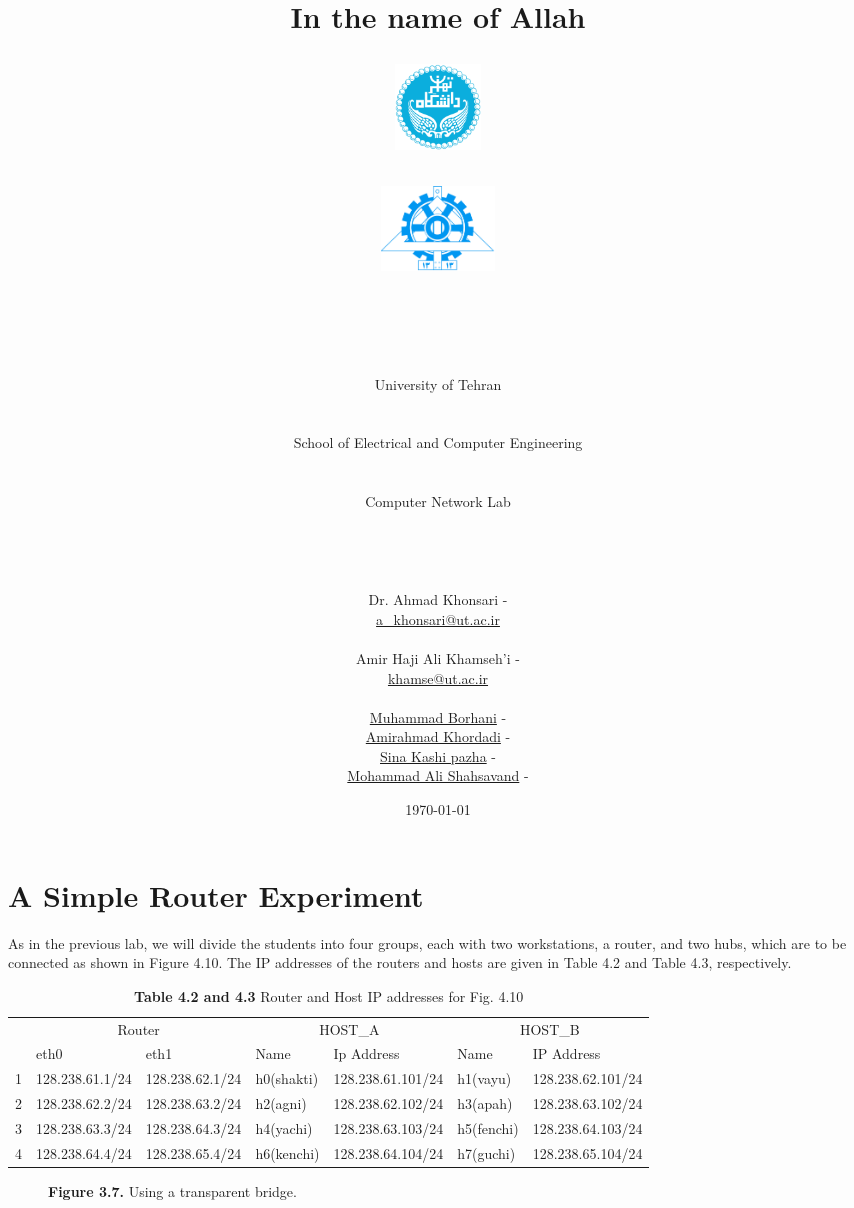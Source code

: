 \documentclass[10pt,a4paper]{article}
\title{
\normalsize In the name of Allah\\
\vspace{10pt}
\LARGE\FR{بسم \allah\  الرحمن الرحیم}
\vspace{10pt}
\begin{center}
    \begin{minipage}{0.48\textwidth}
        \begin{flushleft}
            \includegraphics[height=64pt,width=64pt]{../img/logo.png}
        \end{flushleft}
    \end{minipage}
    \begin{minipage}{0.48\textwidth}
        \begin{flushright}
            \includegraphics[height=64pt]{../img/eng-logo.png}
        \end{flushright}
    \end{minipage}
\end{center}
\vspace*{-64pt}
\huge \titleText\\
\vspace{40pt}
}
\author{
	\huge University of Tehran\\
    \LARGE \FR{دانشگاه تهران}\\\\
    \LARGE School of Electrical and Computer Engineering\\
    \FR{دانشکده مهندسی برق و کامپیوتر}\\\\
    \Large Computer Network Lab\\
    \FR{آزمایشگاه شبکه‌های کامپیوتری}\\\\\\\\
    \normalfont
    Dr. Ahmad Khonsari - \FR{احمد خونساری}\\
    \href{mailto:a_khonsari@ut.ac.ir}{a\_khonsari@ut.ac.ir}\\\\
    \normalsize
    Amir Haji Ali Khamseh'i - \FR{امیر حاجی علی خمسه‌ء}\\
    \href{mailto:khamse@ut.ac.ir}{khamse@ut.ac.ir}\\\\
    \normalsize \href{mailto:m.borhani@ut.ac.ir}{Muhammad Borhani} - \FR{محمد برهانی}\\
	\normalsize \href{mailto:a.a.khordadi@ut.ac.ir}{Amirahmad Khordadi} - \FR{امیر احمد خردادی}\\
	\normalsize \href{mailto:sina\_kashipazha@ut.ac.ir}{Sina Kashi pazha} - \FR{سینا کاشی پزها}\\
	\normalsize \href{mailto:mashahsavand@ut.ac.ir}{Mohammad Ali Shahsavand} - \FR{محمد علی شاهسوند}
}
\date{\vspace{30pt}\today\\\vspace{10pt}{\selectlanguage{farsi}\today}}
\numberwithin{equation}{section}
\numberwithin{figure}{section}
\numberwithin{table}{section}
\begin{document}

    \maketitle


    \pagebreak

\section*{A Simple Router Experiment}
    As in the previous lab, we will divide the students into four groups, each with two workstations, a router, and two hubs, which are to be connected as shown in Figure 4.10.
    The IP addresses of the routers and hosts are given in Table 4.2 and Table 4.3, respectively.
    \begin{table}[H]
        \caption{\textbf{Table 4.2 and 4.3} Router and Host IP addresses for Fig. 4.10}
        \vspace{5pt}
        \centering
        \large
        \begin{tabular}{ *7l }
            \hline \hline
                & \multicolumn{2}{c}{Router} & \multicolumn{2}{c}{HOST\_A} & \multicolumn{2}{c}{HOST\_B} \\
            & eth0 & eth1 & Name & Ip Address & Name & IP Address \\
            \hline 
            1 & 128.238.61.1/24 & 128.238.62.1/24 & h0(shakti) & 128.238.61.101/24 & h1(vayu) & 128.238.62.101/24 \\
            2 & 128.238.62.2/24 & 128.238.63.2/24 & h2(agni) & 128.238.62.102/24 & h3(apah) & 128.238.63.102/24 \\
            3 & 128.238.63.3/24 & 128.238.64.3/24 & h4(yachi) & 128.238.63.103/24 & h5(fenchi) & 128.238.64.103/24 \\
            4 & 128.238.64.4/24 & 128.238.65.4/24 & h6(kenchi) & 128.238.64.104/24 & h7(guchi) & 128.238.65.104/24 \\
            \hline \hline
            \end{tabular}
    \end{table}

    \begin{figure}[H]
        \centering
        \caption{\textbf{Figure 3.7.} Using a transparent bridge.}        
    \end{figure}
\end{document}
